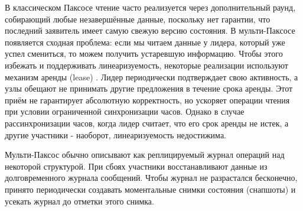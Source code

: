 В классическом Паксосе чтение часто реализуется через дополнительный раунд,
собирающий любые незавершённые данные, поскольку нет гарантии, что последний
заявитель имеет самую свежую версию состояния. В мульти-Паксосе появляется
сходная проблема: если мы читаем данные у лидера, который уже успел смениться,
то можем получить устаревшую информацию. Чтобы этого избежать и поддерживать
линеаризуемость, некоторые реализации используют механизм аренды (lease)
\cite{chandra07}. Лидер периодически подтверждает свою активность, а узлы
обещают не принимать другие предложения в течение срока аренды. Этот приём не
гарантирует абсолютную корректность, но ускоряет операции чтения при условии
ограниченной синхронизации часов. Однако в случае рассинхронизации часов, когда
лидер считает, что его срок аренды не истек, а другие участники - наоборот,
линеаризуемость недостижима.

Мульти-Паксос обычно описывают как реплицируемый журнал операций над некоторой
структурой. При сбоях участники восстанавливают данные из долговременного журнала
сообщений. Чтобы журнал не разрастался бесконечно, принято периодически
создавать моментальные снимки состояния (снапшоты) и усекать журнал до отметки
этого снимка.
